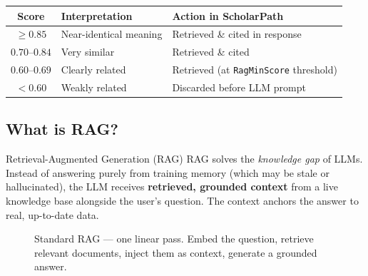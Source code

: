\documentclass[11pt,a4paper]{article}
\begin{document}
\begin{center}
\begin{tabular}{clp{7cm}}
\toprule
\textbf{Score} & \textbf{Interpretation} & \textbf{Action in ScholarPath}\\
\midrule
$\geq 0.85$ & Near-identical meaning & Retrieved \& cited in response\\
$0.70$--$0.84$ & Very similar & Retrieved \& cited\\
$0.60$--$0.69$ & Clearly related & Retrieved (at \texttt{RagMinScore} threshold)\\
$<0.60$ & Weakly related & Discarded before LLM prompt\\
\bottomrule
\end{tabular}
\end{center}

\subsection{What is RAG?}

\begin{conceptbox}{Retrieval-Augmented Generation (RAG)}
RAG solves the \emph{knowledge gap} of LLMs. Instead of answering purely from
training memory (which may be stale or hallucinated), the LLM receives
\textbf{retrieved, grounded context} from a live knowledge base alongside the
user's question. The context anchors the answer to real, up-to-date data.
\end{conceptbox}

\begin{figure}[H]
\centering
{}
\caption{Standard RAG --- one linear pass. Embed the question, retrieve relevant documents,
  inject them as context, generate a grounded answer.}
\end{figure}
\end{document}
